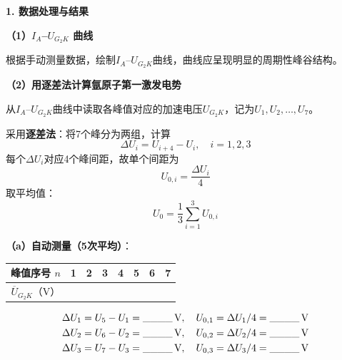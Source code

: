 \documentclass[a4paper,12pt]{article}
\begin{document}
\vspace{0.5cm}

{\fontsize{14pt}{20pt}\selectfont \textbf{1. 数据处理与结果}}

\vspace{0.3cm}

{\fontsize{12pt}{18pt}\selectfont

\textbf{（1）$I_A$--$U_{G_2K}$ 曲线}

根据手动测量数据，绘制$I_A$--$U_{G_2K}$曲线，曲线应呈现明显的周期性峰谷结构。


\vspace{0.5cm}

\textbf{（2）用逐差法计算氩原子第一激发电势}

从$I_A$--$U_{G_2K}$曲线中读取各峰值对应的加速电压$U_{G_2K}$，记为$U_1, U_2, \ldots, U_7$。

采用\textbf{逐差法}：将7个峰分为两组，计算
\[
    \Delta U_i = U_{i+4} - U_i, \quad i = 1, 2, 3
\]
每个$\Delta U_i$对应4个峰间距，故单个间距为
\[
    U_{0,i} = \frac{\Delta U_i}{4}
\]
取平均值：
\[
    U_0 = \frac{1}{3}\sum_{i=1}^{3} U_{0,i}
\]

\textbf{（a）自动测量（5次平均）}：

\vspace{0.2cm}

\begin{tabular}{c|ccccccc}
    \toprule
    峰值序号 $n$ & 1 & 2 & 3 & 4 & 5 & 6 & 7 \\
    \midrule
    $\overline{U}_{G_2K}$（V） & & & & & & & \\
    \bottomrule
\end{tabular}

\vspace{0.3cm}

\begin{align}
    \Delta U_1 &= U_5 - U_1 = \text{\_\_\_\_}\text{\,V}, \quad U_{0,1} = \Delta U_1 / 4 = \text{\_\_\_\_}\text{\,V} \notag \\
    \Delta U_2 &= U_6 - U_2 = \text{\_\_\_\_}\text{\,V}, \quad U_{0,2} = \Delta U_2 / 4 = \text{\_\_\_\_}\text{\,V} \notag \\
    \Delta U_3 &= U_7 - U_3 = \text{\_\_\_\_}\text{\,V}, \quad U_{0,3} = \Delta U_3 / 4 = \text{\_\_\_\_}\text{\,V} \notag
\end{align}

}
\end{document}
